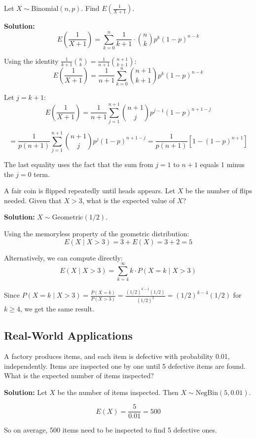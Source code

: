 \begin{eg}
Let \(X \sim \text{Binomial}(n, p)\). Find \(E\left(\frac{1}{X+1}\right)\).

\textbf{Solution:}
\[
E\left(\frac{1}{X+1}\right) = \sum_{k=0}^{n} \frac{1}{k+1} \cdot \binom{n}{k} p^k (1-p)^{n-k}
\]

Using the identity \(\frac{1}{k+1} \binom{n}{k} = \frac{1}{n+1} \binom{n+1}{k+1}\):
\[
E\left(\frac{1}{X+1}\right) = \frac{1}{n+1} \sum_{k=0}^{n} \binom{n+1}{k+1} p^k (1-p)^{n-k}
\]

Let \(j = k+1\):
\[
E\left(\frac{1}{X+1}\right) = \frac{1}{n+1} \sum_{j=1}^{n+1} \binom{n+1}{j} p^{j-1} (1-p)^{n+1-j}
\]

\[
= \frac{1}{p(n+1)} \sum_{j=1}^{n+1} \binom{n+1}{j} p^j (1-p)^{n+1-j} = \frac{1}{p(n+1)} [1 - (1-p)^{n+1}]
\]

The last equality uses the fact that the sum from \(j=1\) to \(n+1\) equals 1 minus the \(j=0\) term.
\end{eg}

\begin{eg}
A fair coin is flipped repeatedly until heads appears. Let \(X\) be the number of flips needed. Given that \(X > 3\), what is the expected value of \(X\)?

\textbf{Solution:}
\(X \sim \text{Geometric}(1/2)\).

Using the memoryless property of the geometric distribution:
\[
E(X \mid X > 3) = 3 + E(X) = 3 + 2 = 5
\]

Alternatively, we can compute directly:
\[
E(X \mid X > 3) = \sum_{k=4}^{\infty} k \cdot P(X = k \mid X > 3)
\]

Since \(P(X = k \mid X > 3) = \frac{P(X = k)}{P(X > 3)} = \frac{(1/2)^{k-1}(1/2)}{(1/2)^3} = (1/2)^{k-4}(1/2)\) for \(k \geq 4\), we get the same result.
\end{eg}

\subsection{Real-World Applications}

\begin{eg}
A factory produces items, and each item is defective with probability 0.01, independently. Items are inspected one by one until 5 defective items are found. What is the expected number of items inspected?

\textbf{Solution:}
Let \(X\) be the number of items inspected. Then \(X \sim \text{NegBin}(5, 0.01)\).

\[
E(X) = \frac{5}{0.01} = 500
\]

So on average, 500 items need to be inspected to find 5 defective ones.
\end{eg}

